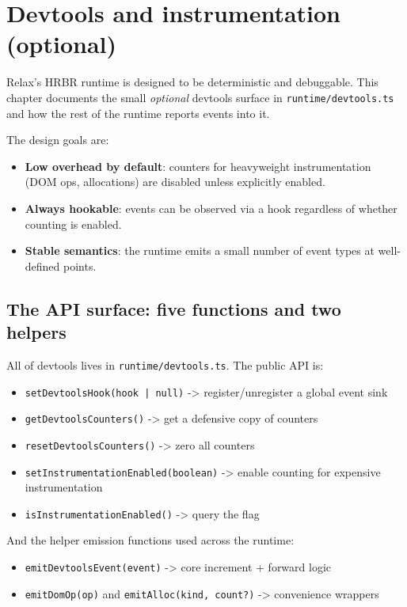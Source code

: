 \chapter{Devtools and instrumentation (optional)}
\label{ch:devtools}

Relax's HRBR runtime is designed to be deterministic and debuggable.
This chapter documents the small \emph{optional} devtools surface in \texttt{runtime/devtools.ts} and how the rest of the runtime reports events into it.

The design goals are:

\begin{itemize}
\item \textbf{Low overhead by default}: counters for heavyweight instrumentation (DOM ops, allocations) are disabled unless explicitly enabled.
\item \textbf{Always hookable}: events can be observed via a hook regardless of whether counting is enabled.
\item \textbf{Stable semantics}: the runtime emits a small number of event types at well-defined points.
\end{itemize}

\section{The API surface: five functions and two helpers}

All of devtools lives in \texttt{runtime/devtools.ts}.
The public API is:

\begin{itemize}
\item \texttt{setDevtoolsHook(hook | null)} -> register/unregister a global event sink
\item \texttt{getDevtoolsCounters()} -> get a defensive copy of counters
\item \texttt{resetDevtoolsCounters()} -> zero all counters
\item \texttt{setInstrumentationEnabled(boolean)} -> enable counting for expensive instrumentation
\item \texttt{isInstrumentationEnabled()} -> query the flag
\end{itemize}

And the helper emission functions used across the runtime:

\begin{itemize}
\item \texttt{emitDevtoolsEvent(event)} -> core increment + forward logic
\item \texttt{emitDomOp(op)} and \texttt{emitAlloc(kind, count?)} -> convenience wrappers
\end{itemize}

